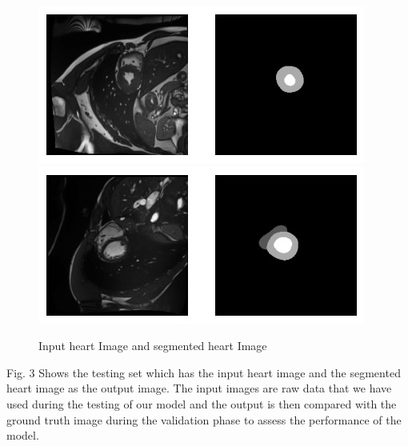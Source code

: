 \documentclass[runningheads]{llncs}
\begin{document}
 \begin{figure}[h]
    \centering
    \includegraphics[scale=0.4]{testingset1.jpg}
    \centering
    \includegraphics[scale=0.4]{testingset2.jpg}
    \caption{Input heart Image and segmented heart Image}
    \label{fig:spectogram}
\end{figure}
Fig. 3 Shows the testing set which has the input heart image and the segmented heart image as the output image. The input images are raw data that we have used during the testing of our model and the output is then compared with the ground truth image during the validation phase to assess the performance of the model.
\medskip
\end{document}
